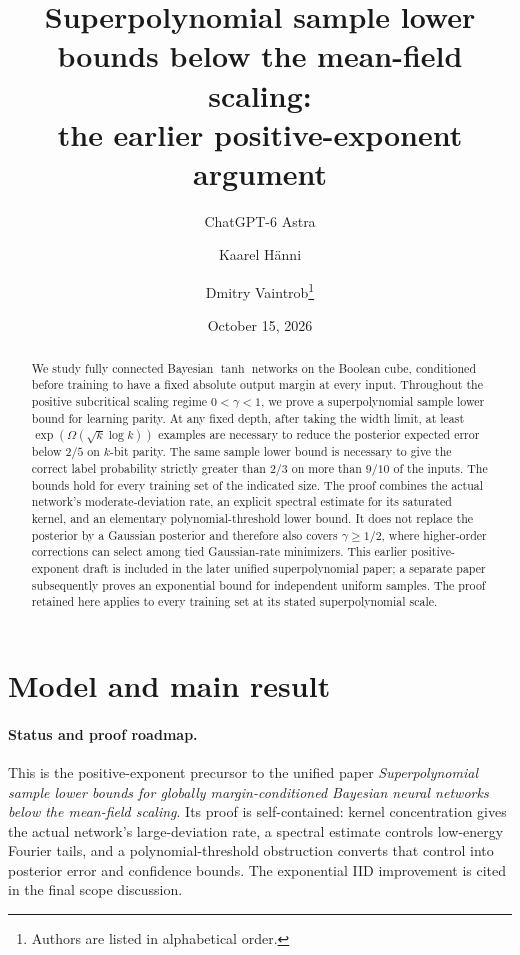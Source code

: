 \documentclass[11pt]{article}
\title{Superpolynomial sample lower bounds below the mean-field scaling:\\
the earlier positive-exponent argument}
\author{ChatGPT-6 Astra \and Kaarel H\"anni \and Dmitry Vaintrob\thanks{Authors are listed in alphabetical order.}}
\date{October 15, 2026}
\theoremstyle{remark}\newtheorem{remark}[theorem]{Remark}
\begin{document}
\maketitle
\begin{abstract}
We study fully connected Bayesian $\tanh$ networks on the Boolean cube,
conditioned before training to have a fixed absolute output margin at
every input. Throughout the positive subcritical scaling regime
$0<\gamma<1$, we prove a superpolynomial sample lower bound for learning
parity. At any fixed depth, after taking the width limit, at least
$\exp(\Omega(\sqrt{k}\log k))$ examples are necessary to reduce the
posterior expected error below $2/5$ on $k$-bit parity. The same sample
lower bound is necessary to give the correct label probability strictly
greater than $2/3$ on more than $9/10$ of the inputs. The bounds hold for
every training set of the indicated size. The proof combines the
actual network's moderate-deviation rate, an explicit spectral estimate
for its saturated kernel, and an elementary polynomial-threshold lower
bound. It does not replace the posterior by a Gaussian posterior and
therefore also covers $\gamma\ge1/2$, where higher-order corrections can
select among tied Gaussian-rate minimizers. This earlier positive-exponent
draft is included in the later unified superpolynomial paper; a separate
paper subsequently proves an exponential bound for independent uniform
samples. The proof retained here applies to every training set at its
stated superpolynomial scale.
\end{abstract}

\section{Model and main result}
\paragraph{Status and proof roadmap.}
This is the positive-exponent precursor to the unified paper
\emph{Superpolynomial sample lower bounds for globally margin-conditioned
Bayesian neural networks below the mean-field scaling}. Its proof is
self-contained: kernel concentration gives the actual network's
large-deviation rate, a spectral estimate controls low-energy Fourier
tails, and a polynomial-threshold obstruction converts that control into
posterior error and confidence bounds. The exponential IID improvement
is cited in the final scope discussion.
\end{document}

